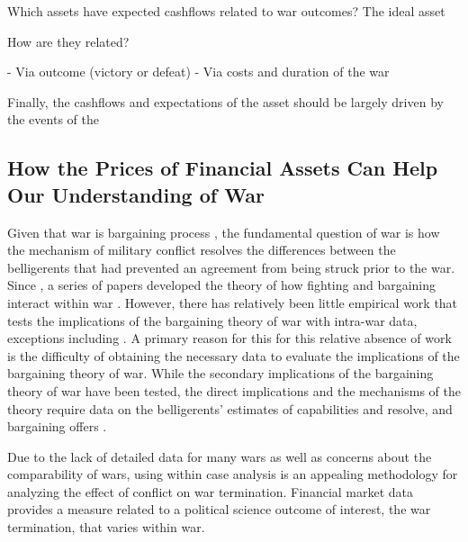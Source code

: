 Which assets have expected cashflows related to war outcomes? 
The ideal asset

How are they related? 

- Via outcome (victory or defeat)
- Via costs and duration of the war

Finally, the cashflows and expectations of the asset should be largely driven by the events of the 


\subsection{How the Prices of Financial Assets Can Help Our Understanding of War}
\label{bonds_battles:sec:how-prices-financial-1}

Given that war is bargaining process \parencite{Fearon1995}, the fundamental question of war is how the mechanism of military conflict resolves the differences between the belligerents that had prevented an agreement from being struck prior to the war.
Since \textcite{Fearon1995}, a series of papers developed the theory of how fighting and bargaining interact within war \parencites{FilsonWerner2002}{Slantchev2003}{SmithStam2004}{Powell2004}{LeventogluSlantchev2007}{LangloisLanglois2009}{WolfordReiterCarrubba2011}.
However, there has relatively been little empirical work that tests the implications of the bargaining theory of war with intra-war data, exceptions including \textcites{Goemans2000}{Ramsay2008}{Reiter2009}{Weisiger2013}{Weisiger2015}.
A primary reason for this for this relative absence of work is the difficulty of obtaining the necessary data to evaluate the implications of the bargaining theory of war.
While the secondary implications of the bargaining theory of war have been tested, the direct implications and the mechanisms of the theory require data on the belligerents' estimates of capabilities and resolve, and bargaining offers \parencite[32]{Reiter2003}.

Due to the lack of detailed data for many wars as well as concerns about the comparability of wars, using within case analysis is an appealing methodology for analyzing the effect of conflict on war termination.
Financial market data provides a measure related to a political science outcome of interest, the war termination, that varies within war.

